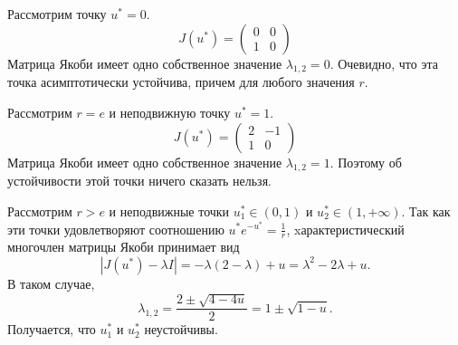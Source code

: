             Рассмотрим точку $u^* = 0$. 
            $$
                J(u^*)=
                \begin{pmatrix}
                    0 & 0 \\
                    1 & 0
                \end{pmatrix}
            $$
            Матрица Якоби имеет одно собственное значение $\lambda_{1, 2} = 0$. Очевидно, что эта точка асимптотически устойчива, причем для любого значения $r$.

            Рассмотрим $r = e$ и неподвижную точку $u^* = 1$.
            $$
                J(u^*)=
                \begin{pmatrix}
                    2 & -1 \\
                    1 & 0
                \end{pmatrix}
            $$
            Матрица Якоби имеет одно собственное значение $\lambda_{1, 2} = 1$. Поэтому об устойчивости этой точки ничего сказать нельзя.

            Рассмотрим $r > e$ и неподвижные точки $u^*_1 \in (0, 1)$ и $u^*_2 \in (1, +\infty)$.
            Так как эти точки удовлетворяют соотношению $u^*e^{-u^*} = \frac{1}{r}$, xарактеристический многочлен матрицы Якоби принимает вид
            $$
                |J(u^*) - \lambda I|
                =
                -\lambda(2 - \lambda) + u
                =
                \lambda^2 - 2\lambda + u.
            $$
            В таком случае,
            $$
                \lambda_{1, 2}
                =
                \frac{2 \pm \sqrt{4 - 4u}}{2}
                =
                1 \pm \sqrt{1 - u}.
            $$
            Получается, что $u^*_1$ и $u^*_2$ неустойчивы.

